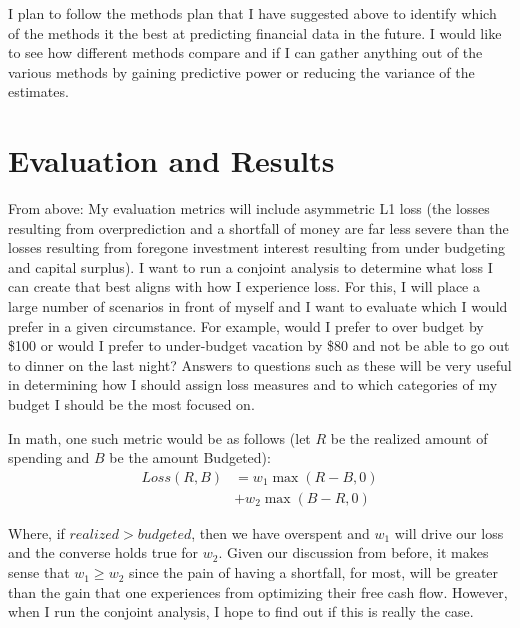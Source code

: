 \documentclass[11pt,a4paper]{article}
\newenvironment{updatematerial}{
\color{blue}
}{

}
\begin{document}
\begin{updatematerial}
	I plan to follow the methods plan that I have suggested above to identify which of the methods it the best at predicting financial data in the future. I would like to see how different methods compare and if I can gather anything out of the various methods by gaining predictive power or reducing the variance of the estimates. 
\end{updatematerial}


\section{Evaluation and Results} \label{sec:results}

From above: My evaluation metrics will include asymmetric L1 loss (the losses resulting from overprediction and a shortfall of money are far less severe than the losses resulting from foregone investment interest resulting from under budgeting and capital surplus). I want to run a conjoint analysis to determine what loss I can create that best aligns with how I experience loss. For this, I will place a large number of scenarios in front of myself and I want to evaluate which I would prefer in a given circumstance. For example, would I prefer to over budget by \$100 or would I prefer to under-budget vacation by \$80 and not be able to go out to dinner on the last night? Answers to questions such as these will be very useful in determining how I should assign loss measures and to which categories of my budget I should be the most focused on. 

In math, one such metric would be as follows (let $R$ be the realized amount of spending and $B$ be the amount Budgeted):
\begin{align}
Loss(R, B) &= w_1 \max(R - B, 0) \nonumber \\
&+ w_2 \max(B - R, 0)
\end{align}

Where, if $realized > budgeted$, then we have overspent and $w_1$ will drive our loss and the converse holds true for $w_2$. Given our discussion from before, it makes sense that $w_1 \geq w_2$ since the pain of having a shortfall, for most, will be greater than the gain that one experiences from optimizing their free cash flow. However, when I run the conjoint analysis, I hope to find out if this is really the case. 
\end{document}
